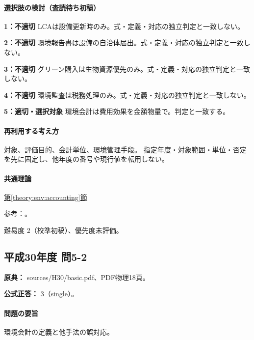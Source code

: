 \paragraph{選択肢の検討（査読待ち初稿）}\mbox{}\par

\noindent\textbf{1：不適切} LCAは設備更新時のみ。式・定義・対応の独立判定と一致しない。\par

\noindent\textbf{2：不適切} 環境報告書は設備の自治体届出。式・定義・対応の独立判定と一致しない。\par

\noindent\textbf{3：不適切} グリーン購入は生物資源優先のみ。式・定義・対応の独立判定と一致しない。\par

\noindent\textbf{4：不適切} 環境監査は税務処理のみ。式・定義・対応の独立判定と一致しない。\par

\noindent\textbf{5：適切・選択対象} 環境会計は費用効果を金額物量で。判定と一致する。\par

\paragraph{再利用する考え方} 対象、評価目的、会計単位、環境管理手段。 指定年度・対象範囲・単位・否定を先に固定し、他年度の番号や現行値を転用しない。

\paragraph{共通理論} \hyperref[theory:env:accounting]{第\ref*{theory:env:accounting}節}

\par 参考：\cite{env58_accounting}。

\par 難易度 2（校準初稿）、優先度未評価。

\subsection{平成30年度 問5-2}
\label{q:h30-reg-basic-5-2}

\noindent\textbf{原典：} sources/H30/basic.pdf、PDF物理18頁。

\textbf{公式正答：} 3（single）。

\paragraph{問題の要旨} 環境会計の定義と他手法の誤対応。

